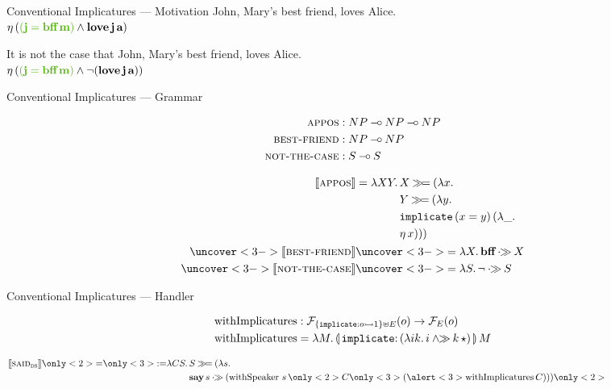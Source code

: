 \documentclass{beamer}
\begin{document}
\begin{frame}{Conventional Implicatures --- Motivation}
  John, Mary's best friend, loves Alice. \\
  $\etaE{(\textcolor{cicolor}{(\obj{j} = \ap{\obj{bff}}{\obj{m}})} \land \app{\obj{love}}{\obj{j}}{\obj{a}})}$

  \vfill
  
  It is not the case that John, Mary's best friend, loves Alice. \\
  $\etaE{(\textcolor{cicolor}{(\obj{j} = \ap{\obj{bff}}{\obj{m}})} \land \lnot (\app{\obj{love}}{\obj{j}}{\obj{a}}))}$
\end{frame}


\begin{frame}{Conventional Implicatures --- Grammar}

\begin{align*}
  \textsc{appos} &: NP \mathbin{{-}\mkern-3.5mu{\circ}} NP \mathbin{{-}\mkern-3.5mu{\circ}} NP \\
  \textsc{best-friend} &: NP \mathbin{{-}\mkern-3.5mu{\circ}} NP \\
  \textsc{not-the-case} &: S \mathbin{{-}\mkern-3.5mu{\circ}} S
\end{align*}

\pause
\vfill

\begin{align*}
  \lex{appos}{\lam{X Y}{\begin{aligned}[t]
        &X \hsbind (\lam{x}{ \\
        &Y \hsbind (\lam{y}{ \\
        &\app{\op{implicate}}{(x = y)}{(\lam{\_}{ \\
        &\etaE{x}})}})})
      \end{aligned}}} \\
  \uncover<3->{\sem{\abs{best-friend}}} &\uncover<3->{= \lam{X}{\obj{bff} \apr X}} \\
  \uncover<3->{\sem{\abs{not-the-case}}} &\uncover<3->{= \lam{S}{\lnot \apr S}}
\end{align*}
\end{frame}


\begin{frame}{Conventional Implicatures --- Handler}
  
\begin{align*}
  \withImplicatures &: \FF_{\{\typedop{implicate}{o}{1}\} \uplus E}(o) \to \FF_E(o) \\
  \withImplicatures &= \lam{M}{\ap{\banana{\onto{\op{implicate}}{(\lam{i k}{i \andr \ap{k}{\star}})}}}{M}}
\end{align*}

\pause

\begin{align*}
  \sem{\abs{said}_{\abs{ds}}} \only<2>{=}\only<3>{:=} \lam{C S}{
    &S \hsbind (\lam{s}{ \\
    &\ap{\obj{say}}{s} \apr (\app{\withSpeaker}{s}{\only<2>{C}\only<3>{(\ap{\alert<3>{\withImplicatures}}{C})}})})}\only<2>{\hspace{34mm}}
\end{align*}
\end{frame}
\end{document}
